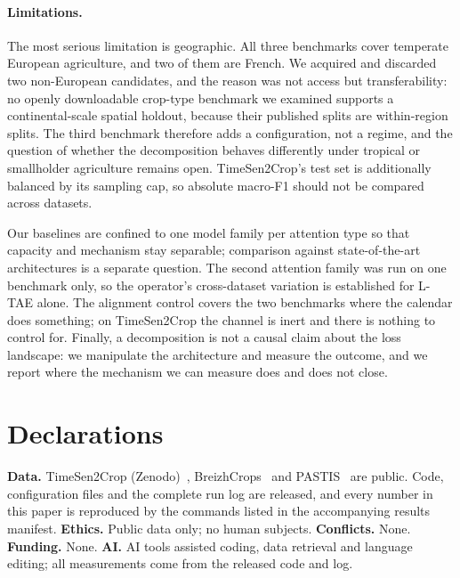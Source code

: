 \documentclass[journal]{IEEEtran}
\begin{document}
\paragraph{Limitations.}
The most serious limitation is geographic. All three benchmarks cover
temperate European agriculture, and two of them are French. We acquired and
discarded two non-European candidates, and the reason was not access but
transferability: no openly downloadable crop-type benchmark we examined supports
a continental-scale spatial holdout, because their published splits are
within-region splits. The third benchmark therefore adds a configuration, not a
regime, and the question of whether the decomposition behaves differently under
tropical or smallholder agriculture remains open. TimeSen2Crop's test set is
additionally balanced by its sampling cap, so absolute macro-F1 should not be
compared across datasets.

Our baselines are confined to one model family per attention type so that
capacity and mechanism stay separable; comparison against state-of-the-art
architectures is a separate question. The second attention family was run on
one benchmark only, so the operator's cross-dataset variation is established for
L-TAE alone. The alignment control covers the two benchmarks where the calendar
does something; on TimeSen2Crop the channel is inert and there is nothing to
control for. Finally, a decomposition is not a causal claim about the loss
landscape: we manipulate the architecture and measure the outcome, and we
report where the mechanism we can measure does and does not close.

\section*{Declarations}
\textbf{Data.} TimeSen2Crop (Zenodo)~\cite{timesen2crop},
BreizhCrops~\cite{breizhcrops} and PASTIS~\cite{utae} are public. Code,
configuration files and the complete run log are released, and every number in
this paper is reproduced by the commands listed in the accompanying results
manifest. \textbf{Ethics.} Public data only; no human subjects.
\textbf{Conflicts.} None. \textbf{Funding.} None. \textbf{AI.} AI tools
assisted coding, data retrieval and language editing; all measurements come
from the released code and log.
\end{document}
